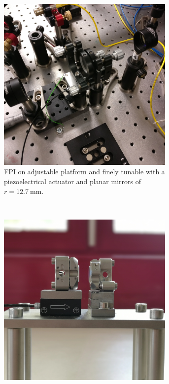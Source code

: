 \begin{figure}[H]
	\centering
	\begin{subfigure}[b]{0.48\textwidth}
		\centering
		\includegraphics[width=0.95\textwidth]{figures/fabry-perot/setup/old}
		\caption{FPI on adjustable platform and finely tunable with a piezoelectrical actuator and planar mirrors of $r=\SI{12.7}{\milli \meter}$.\\}
		\label{fig:old}
	\end{subfigure}%
	~ %
	\begin{subfigure}[b]{0.48\textwidth}
		\centering
		\includegraphics[width=0.95\textwidth]{figures/fabry-perot/setup/new}

\end{subfigure}
\end{figure}
